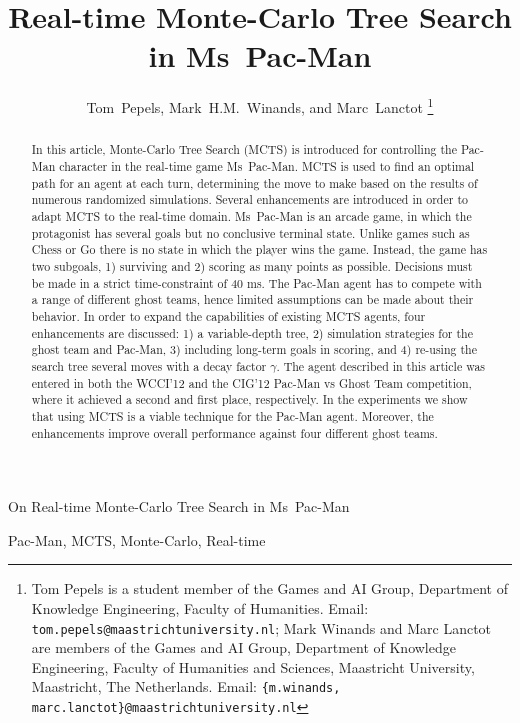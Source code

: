 \documentclass[journal]{IEEEtran}
\begin{document}
\title{Real-time Monte-Carlo Tree Search in Ms~Pac-Man}
\author{Tom~Pepels, Mark~H.M.~Winands, and Marc~Lanctot%
\thanks{Tom Pepels is a student member of the Games and AI Group, Department of Knowledge Engineering, Faculty of Humanities. Email: {\tt tom.pepels@maastrichtuniversity.nl}; 
Mark Winands and Marc Lanctot are members of the Games and AI Group, Department of Knowledge Engineering, Faculty of Humanities
and Sciences, Maastricht University, Maastricht, The Netherlands. 
Email: {\tt \{m.winands, marc.lanctot\}@maastrichtuniversity.nl}
}}
%
{On Real-time Monte-Carlo Tree Search in Ms~Pac-Man}
\maketitle

\begin{abstract}
In this article, Monte-Carlo Tree Search (MCTS) is introduced for controlling the Pac-Man character in the real-time game Ms~Pac-Man. MCTS is used to find an optimal path for an agent at each turn, determining the move to make based on the results of numerous randomized simulations. Several enhancements are introduced in order to adapt MCTS to the real-time domain. Ms~Pac-Man is an arcade game, in which the protagonist has several goals but no conclusive terminal state. Unlike games such as Chess or Go there is no state in which the player wins the game. Instead, the game has two subgoals, 1) surviving and 2) scoring as many points as possible. Decisions must be made in a strict time-constraint of 40 ms. The Pac-Man agent has to compete with a range of different ghost teams, hence limited assumptions can be made about their behavior. In order to expand the capabilities of existing MCTS agents, four enhancements are discussed: 1) a variable-depth tree, 2) simulation strategies for the ghost team and Pac-Man, 3) including long-term goals in scoring, and 4) re-using the search tree several moves with a decay factor $\gamma$. The agent described in this article was entered in both the WCCI'12 and the CIG'12 Pac-Man vs Ghost Team competition, where it achieved a second and first place, respectively. In the experiments we show that using MCTS is a viable technique for the Pac-Man agent. Moreover, the enhancements improve overall performance against four different ghost teams.
\end{abstract}
\begin{IEEEkeywords}
Pac-Man, MCTS, Monte-Carlo, Real-time
\end{IEEEkeywords}
\IEEEpeerreviewmaketitle
\end{document}
